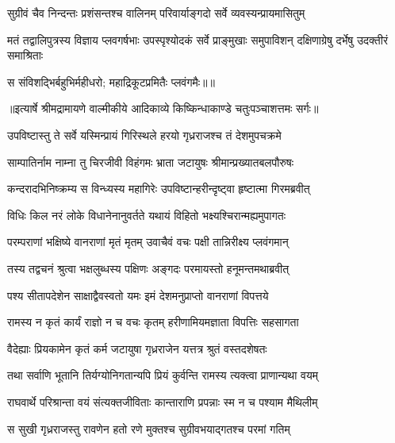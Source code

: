 \twolineshloka
{सुग्रीवं चैव निन्दन्तः प्रशंसन्तश्च वालिनम्}
{परिवार्याङ्गदो सर्वे व्यवस्यन्प्रायमासितुम्} %

\threelineshloka
{मतं तद्वालिपुत्रस्य विज्ञाय प्लवगर्षभाः}
{उपस्पृश्योदकं सर्वे प्राङ्मुखाः समुपाविशन्}
{दक्षिणाग्रेषु दर्भेषु उदक्तीरं समाश्रिताः} %

{स संविशद्भिर्बहुभिर्महीधरो; महाद्रिकूटप्रमितैः प्लवंगमैः॥॥} %

\addtocounter{shlokacount}{1}


{॥इत्यार्षे श्रीमद्रामायणे वाल्मीकीये आदिकाव्ये किष्किन्धाकाण्डे चतुःपञ्चाशत्तमः सर्गः॥}


\twolineshloka
{उपविष्टास्तु ते सर्वे यस्मिन्प्रायं गिरिस्थले}
{हरयो गृध्रराजश्च तं देशमुपचक्रमे} %

\twolineshloka
{साम्पातिर्नाम नाम्ना तु चिरजीवी विहंगमः}
{भ्राता जटायुषः श्रीमान्प्रख्यातबलपौरुषः} %

\twolineshloka
{कन्दरादभिनिष्क्रम्य स विन्ध्यस्य महागिरेः}
{उपविष्टान्हरीन्दृष्ट्वा हृष्टात्मा गिरमब्रवीत्} %

\twolineshloka
{विधिः किल नरं लोके विधानेनानुवर्तते}
{यथायं विहितो भक्ष्यश्चिरान्मह्यमुपागतः} %

\twolineshloka
{परम्पराणां भक्षिष्ये वानराणां मृतं मृतम्}
{उवाचैवं वचः पक्षी तान्निरीक्ष्य प्लवंगमान्} %

\twolineshloka
{तस्य तद्वचनं श्रुत्वा भक्षलुब्धस्य पक्षिणः}
{अङ्गदः परमायस्तो हनूमन्तमथाब्रवीत्} %

\twolineshloka
{पश्य सीतापदेशेन साक्षाद्वैवस्वतो यमः}
{इमं देशमनुप्राप्तो वानराणां विपत्तये} %

\twolineshloka
{रामस्य न कृतं कार्यं राज्ञो न च वचः कृतम्}
{हरीणामियमज्ञाता विपत्तिः सहसागता} %

\twolineshloka
{वैदेह्याः प्रियकामेन कृतं कर्म जटायुषा}
{गृध्रराजेन यत्तत्र श्रुतं वस्तदशेषतः} %

\twolineshloka
{तथा सर्वाणि भूतानि तिर्यग्योनिगतान्यपि}
{प्रियं कुर्वन्ति रामस्य त्यक्त्वा प्राणान्यथा वयम्} %

\twolineshloka
{राघवार्थे परिश्रान्ता वयं संत्यक्तजीविताः}
{कान्ताराणि प्रपन्नाः स्म न च पश्याम मैथिलीम्} %

\twolineshloka
{स सुखी गृध्रराजस्तु रावणेन हतो रणे}
{मुक्तश्च सुग्रीवभयाद्गतश्च परमां गतिम्} %

